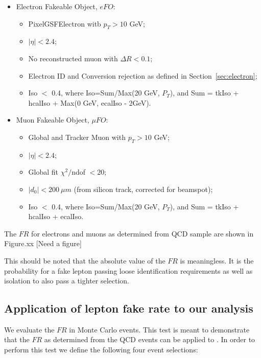 \begin{itemize}
\item Electron Fakeable Object, $eFO$:
\begin{itemize}
\item PixelGSFElectron witb $p_T > 10$ GeV;
\item $|\eta| < 2.4$;
\item No reconstructed muon with $\Delta R < 0.1$;
\item Electron ID and Conversion rejection as defined in Section~\ref{sec:electron};
\item Iso $<$ 0.4, where Iso=Sum/Max(20 GeV, $P_T$), and Sum = tkIso + hcalIso +  Max(0 GeV, ecalIso - 2GeV).
\end{itemize} 

\item Muon Fakeable Object, $\mu FO$:
\begin{itemize}
\item Global and Tracker Muon with $p_T > 10$ GeV;
\item $|\eta| < 2.4$;
\item Global fit $\chi^2 /$ndof $ < 20 $;
\item $|d_0| < 200~\mu m$ (from silicon track, corrected for beamspot);
\item Iso $<$ 0.4, where Iso=Sum/Max(20 GeV, $P_T$), and Sum = tkIso + hcalIso +  ecalIso.
\end{itemize} 
\end{itemize} 

The $FR$ for electrons and muons as determined from QCD sample are shown in Figure.xx [Need a figure]

This should be noted that the absolute value of the $FR$ is meaningless. It is the probability for a
fake lepton passing loose identification requirements as well as isolation to also pass a tighter
selection. 
\subsection{Application of lepton fake rate to our analysis}
\label{subsec:fakerateapplication}

We evaluate the $FR$ in \ttbar Monte Carlo events. This test is meant to demonstrate that the 
$FR$ as determined from the QCD events can be applied to \ttbar. In order to perform this test we 
define the following four event selections:

